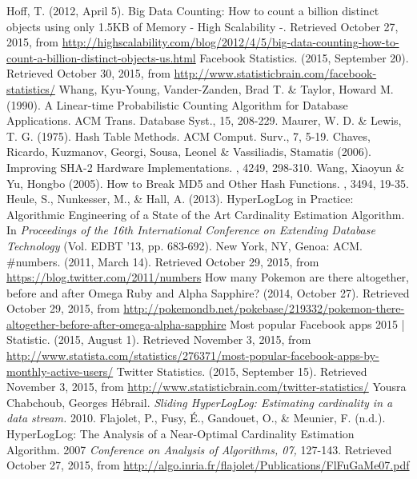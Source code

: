 \documentclass{article}
\begin{document}
\newpage
\begin{thebibliography}{9}
 Hoff, T. (2012, April 5). Big Data Counting: How to count a billion distinct objects using only 1.5KB of Memory - High Scalability -. Retrieved October 27, 2015, from \url{http://highscalability.com/blog/2012/4/5/big-data-counting-how-to-count-a-billion-distinct-objects-us.html}
 Facebook Statistics. (2015, September 20). Retrieved October 30, 2015, from \url{http://www.statisticbrain.com/facebook-statistics/}
 Whang, Kyu-Young, Vander-Zanden, Brad T. \& Taylor, Howard M. (1990). A Linear-time Probabilistic Counting Algorithm for Database Applications. ACM Trans. Database Syst., 15, 208-229.
 Maurer, W. D. \& Lewis, T. G. (1975). Hash Table Methods. ACM Comput. Surv., 7, 5-19.
 Chaves, Ricardo, Kuzmanov, Georgi, Sousa, Leonel \& Vassiliadis, Stamatis (2006). Improving SHA-2 Hardware Implementations. , 4249, 298-310.
 Wang, Xiaoyun \& Yu, Hongbo (2005). How to Break MD5 and Other Hash Functions. , 3494, 19-35.
 Heule, S., Nunkesser, M., \& Hall, A. (2013). HyperLogLog in Practice: Algorithmic Engineering of a State of the Art Cardinality Estimation Algorithm. In \textit{Proceedings of the 16th International Conference on Extending Database Technology} (Vol. EDBT '13, pp. 683-692). New York, NY, Genoa: ACM.
 \#numbers. (2011, March 14). Retrieved October 29, 2015, from \url{https://blog.twitter.com/2011/numbers}
 How many Pokemon are there altogether, before and after Omega Ruby and Alpha Sapphire? (2014, October 27). Retrieved October 29, 2015, from \url{http://pokemondb.net/pokebase/219332/pokemon-there-altogether-before-after-omega-alpha-sapphire}
 Most popular Facebook apps 2015 | Statistic. (2015, August 1). Retrieved November 3, 2015, from \url{http://www.statista.com/statistics/276371/most-popular-facebook-apps-by-monthly-active-users/}
 Twitter Statistics. (2015, September 15). Retrieved November 3, 2015, from \url{http://www.statisticbrain.com/twitter-statistics/}
Yousra Chabchoub, Georges H\'ebrail. \textit{Sliding HyperLogLog: Estimating cardinality in a data stream.} 2010. 
 Flajolet, P., Fusy, \'E., Gandouet, O., \& Meunier, F. (n.d.). HyperLogLog: The Analysis of a Near-Optimal Cardinality Estimation Algorithm. 2007 \textit{Conference on Analysis of Algorithms, 07,} 127-143. Retrieved October 27, 2015, from \url{http://algo.inria.fr/flajolet/Publications/FlFuGaMe07.pdf}
\end{thebibliography}
\end{document}
